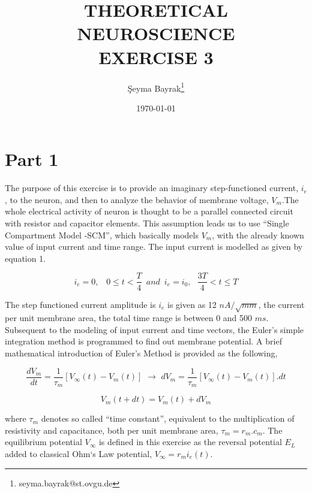 \documentclass{article}
\begin{document}
\title{THEORETICAL NEUROSCIENCE \\ EXERCISE 3}
\date{\today}
\author[1]{\c{S}eyma Bayrak\thanks{seyma.bayrak@st.ovgu.de}}
\maketitle


\section*{Part 1}
The purpose of this exercise is to provide an imaginary step-functioned current, $i_{e}$, to the neuron, and then to analyze the behavior of membrane voltage, $V_{m}$.The whole electrical activity of neuron is thought to be a parallel connected circuit with resistor and capacitor elements. This assumption leads us to use ``Single Compartment Model -SCM'', which basically models $V_{m}$, with the already known value of input current and time range. The input current is modelled as given by equation 1.

\begin{equation}
 i_{e}=0,\,\,\,\,\,  0\le t <\dfrac{T}{4} \,\,\,and\,\,\, i_{e}=i_{0},\,\,\,\, \frac{3T}{4}<t\le T
\end{equation}

The step functioned current amplitude is $i_{e}$ is given as 12 $nA/\sqrt{mm}$, the current per unit membrane area, the total time range is between 0 and 500 $ms$. Subsequent to the modeling of input current and time vectors, the Euler’s simple integration method is programmed to find out membrane potential. A brief mathematical introduction of Euler’s Method is provided as the following,

\begin{equation}
 \dfrac{dV_{m}}{dt}=\dfrac{1}{\tau_{m}}[V_{\infty}(t)-V_{m}(t)] \,\, \longrightarrow \,\, dV_{m}=\dfrac{1}{\tau_{m}}[V_{\infty}(t)-V_{m}(t)].dt
\end{equation}

\begin{equation}
V_{m}(t+dt)=V_{m}(t)+dV_{m}
\end{equation}

where $\tau_{m}$ denotes so called ``time constant'', equivalent to the multiplication of resistivity and capacitance, both per unit membrane area, $\tau_{m}=r_{m}.c_{m}$. The equilibrium potential $V_{\infty}$ is defined in this exercise as the reversal potential $E_{L}$ added to classical Ohm`s Law potential, $V_{\infty}=r_{m}i_{e}(t)$. 
\end{document}
